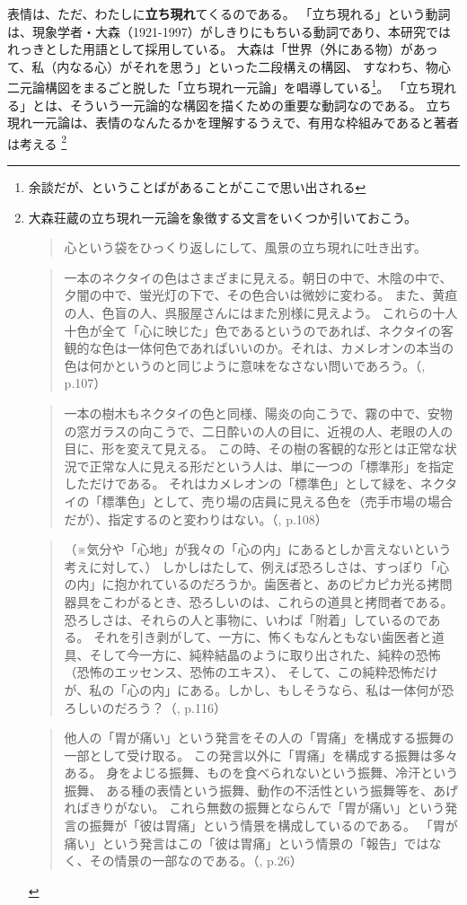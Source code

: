 表情は、ただ、わたしに\textbf{立ち現れ}てくるのである。
「立ち現れる」という動詞は、現象学者・大森\cite{ohmori:1976}（1921-1997）がしきりにもちいる動詞であり、本研究ではれっきとした用語として採用している。
大森は「世界（外にある物）があって、私（内なる心）がそれを思う」といった二段構えの構図、
すなわち、物心二元論構図をまるごと脱した「立ち現れ一元論」を唱導している\footnote{余談だが、ということばがあることがここで思い出される}。
「立ち現れる」とは、そういう一元論的な構図を描くための重要な動詞なのである。
立ち現れ一元論は、表情のなんたるかを理解するうえで、有用な枠組みであると著者は考える
\footnote{
  大森荘蔵の立ち現れ一元論を象徴する文言をいくつか引いておこう。
\begin{quote}
  心という袋をひっくり返しにして、風景の立ち現れに吐き出す。
\end{quote}

\begin{quote}
  一本のネクタイの色はさまざまに見える。朝日の中で、木陰の中で、夕闇の中で、蛍光灯の下で、その色合いは微妙に変わる。 また、黄疸の人、色盲の人、呉服屋さんにはまた別様に見えよう。 これらの十人十色が全て「心に映じた」色であるというのであれば、ネクタイの客観的な色は一体何色であればいいのか。それは、カメレオンの本当の色は何かというのと同じように意味をなさない問いであろう。（\cite{ohmori:1976}, p.107）
\end{quote}
\begin{quote}
  一本の樹木もネクタイの色と同様、陽炎の向こうで、霧の中で、安物の窓ガラスの向こうで、二日酔いの人の目に、近視の人、老眼の人の目に、形を変えて見える。 この時、その樹の客観的な形とは正常な状況で正常な人に見える形だという人は、単に一つの「標準形」を指定しただけである。 それはカメレオンの「標準色」として緑を、ネクタイの「標準色」として、売り場の店員に見える色を（売手市場の場合だが）、指定するのと変わりはない。（\cite{ohmori:1976}, p.108）
\end{quote}
\begin{quote}
  （※気分や「心地」が我々の「心の内」にあるとしか言えないという考えに対して、）
しかしはたして、例えば恐ろしさは、すっぽり「心の内」に抱かれているのだろうか。歯医者と、あのピカピカ光る拷問器具をこわがるとき、恐ろしいのは、これらの道具と拷問者である。恐ろしさは、それらの人と事物に、いわば「附着」しているのである。 それを引き剥がして、一方に、怖くもなんともない歯医者と道具、そして今一方に、純粋結晶のように取り出された、純粋の恐怖（恐怖のエッセンス、恐怖のエキス）、 そして、この純粋恐怖だけが、私の「心の内」にある。しかし、もしそうなら、私は一体何が恐ろしいのだろう？（\cite{ohmori:1976}, p.116）
\end{quote}
\begin{quotation}
    他人の「胃が痛い」という発言をその人の「胃痛」を構成する振舞の一部として受け取る。
    この発言以外に「胃痛」を構成する振舞は多々ある。
    身をよじる振舞、ものを食べられないという振舞、冷汗という振舞、
    ある種の表情という振舞、動作の不活性という振舞等を、あげればきりがない。
    これら無数の振舞とならんで「胃が痛い」という発言の振舞が「彼は胃痛」という情景を構成しているのである。
    「胃が痛い」という発言はこの「彼は胃痛」という情景の「報告」ではなく、その情景の一部なのである。（\cite{ohmori:1971}, p.26）
  

\end{quotation}}
